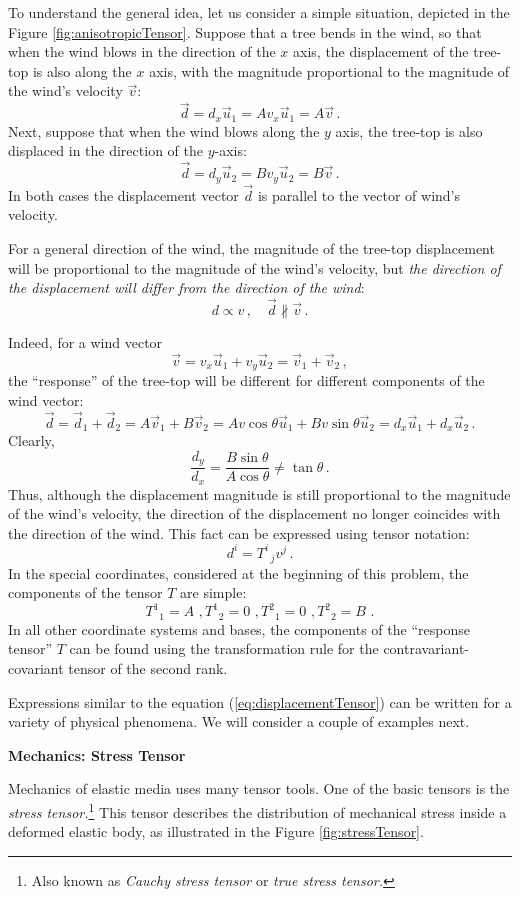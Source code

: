 To understand the general idea, let us consider a simple situation,
depicted in the Figure \ref{fig:anisotropicTensor}. Suppose that a
tree bends in the wind, so that when the wind blows in the direction
of the $x$ axis, the displacement of the tree-top is also along the
$x$ axis, with the magnitude proportional to the magnitude of the
wind's velocity $\vec{v}$:
\[
\vec{d} = d_x\vec{u}_1 = Av_x \vec{u}_1 = A\vec{v}\,.
\]
Next, suppose that when the wind blows along the $y$ axis, the
tree-top is also displaced in the direction of the $y$-axis:
\[
\vec{d} = d_y\vec{u}_2 = Bv_y \vec{u}_2 = B\vec{v}\,.
\]
In both cases the displacement vector $\vec{d}$ is parallel to the vector of
wind's velocity.

For a general direction of the wind, the magnitude of the tree-top
displacement will be proportional to the magnitude of the wind's
velocity, but \emph{the direction of the displacement will differ from
the direction of the wind}:
\[
d\propto v\,,\quad \vec{d}\nparallel\vec{v}\,.
\]

Indeed, for a wind vector
\[
\vec{v} = v_x\vec{u}_1 + v_y\vec{u}_2 = \vec{v}_1 + \vec{v}_2\,,
\]
the ``response'' of the tree-top will be different for different
components of the wind vector:
\[
\vec{d} = \vec{d}_1 + \vec{d}_2 = A\vec{v}_1 + B\vec{v}_2 = Av\cos\theta\vec{u}_1 + Bv\sin\theta\vec{u}_2=d_x\vec{u}_1+d_x\vec{u}_2\,.
\]
Clearly,
\[
\frac{d_y}{d_x} = \frac{B\sin\theta}{A\cos\theta} \ne \tan\theta\,.
\]
Thus, although the displacement magnitude is still proportional to the
magnitude of the wind's velocity, the direction of the displacement no
longer coincides with the direction of the wind. This fact can be
expressed using tensor notation:
\begin{equation}
  d^i = T^i_{\phantom{x}j}v^j\,.
  \label{eq:displacementTensor}
\end{equation}
In the special coordinates, considered at the beginning of this
problem, the components of the tensor $T$ are simple:
\[
T^1_{\phantom{x}1} = A\,\,, T^1_{\phantom{x}2} = 0\,\,,
T^2_{\phantom{x}1} = 0\,\,, T^2_{\phantom{x}2} = B\,\,.
\]
In all other coordinate systems and bases, the components of the
``response tensor'' $T$ can be found using the transformation rule for
the contravariant-covariant tensor of the second rank.


Expressions similar to the equation (\ref{eq:displacementTensor}) can
be written for a variety of physical phenomena. We will consider
a couple of examples next.

\begin{flushleft}
{\bf Mechanics: Stress Tensor}
\end{flushleft}
Mechanics of elastic media uses many tensor tools. One of the basic
tensors is the \emph{stress tensor.}\footnote{Also known as
\emph{Cauchy stress tensor} or \emph{true stress tensor.}} This tensor
describes the distribution of mechanical stress inside a deformed
elastic body, as illustrated in the Figure \ref{fig:stressTensor}.


